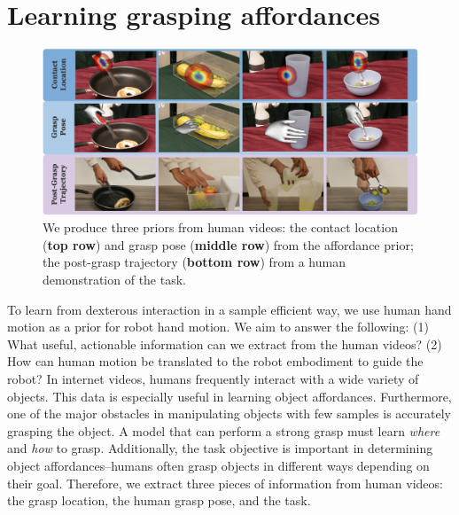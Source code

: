 \section{Learning grasping affordances}
\begin{figure}[t]
\centering
\includegraphics[width=\linewidth]{figs/aff_results.pdf}
\vspace{-0.2in}
  \caption{\small We produce three priors from human videos: the contact location (\textbf{top row}) and grasp pose (\textbf{middle row}) from the affordance prior; the post-grasp trajectory (\textbf{bottom row}) from a human demonstration of the task.}
 \label{fig:aff_results}
 \vspace{-0.15in}
\end{figure}






To learn from dexterous interaction in a sample efficient way, we use human hand motion as a prior for robot hand motion. We aim to answer the following: (1) What useful, actionable information can we extract from the human videos? (2) How can human motion be translated to the robot embodiment to guide the robot? In internet videos, humans frequently interact with a wide variety of objects. This data is especially useful in learning object affordances. Furthermore, one of the major obstacles in manipulating objects with few samples is accurately grasping the object. A model that can perform a strong grasp must learn \textit{where} and \textit{how} to grasp. Additionally, the task objective is important in determining object affordances--humans often grasp objects in different ways depending on their goal. Therefore, we extract three pieces of information from human videos: the grasp location, the human grasp pose, and the task.

